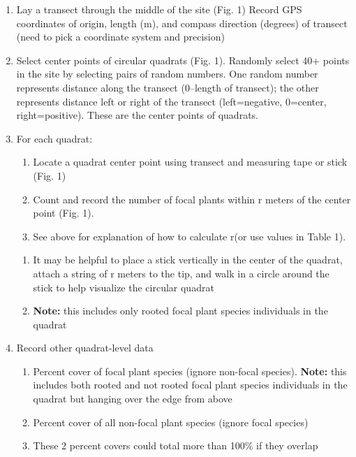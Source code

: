 \documentclass[
  letterpaper,
  DIV=11,
  numbers=noendperiod]{scrreprt}
\begin{document}
\begin{enumerate}
\def\labelenumi{\arabic{enumi}.}
\setcounter{enumi}{4}
\item
  Lay a transect through the middle of the site (Fig. 1) Record GPS
  coordinates of origin, length (m), and compass direction (degrees) of
  transect (need to pick a coordinate system and precision)
\item
  Select center points of circular quadrats (Fig. 1). Randomly select
  40+ points in the site by selecting pairs of random numbers. One
  random number represents distance along the transect (0--length of
  transect); the other represents distance left or right of the transect
  (left=negative, 0=center, right=positive). These are the center points
  of quadrats.
\item
  For each quadrat:

  \begin{enumerate}
  \def\labelenumii{\alph{enumii}.}
  \item
    Locate a quadrat center point using transect and measuring tape or
    stick (Fig. 1)
  \item
    Count and record the number of focal plants within r meters of the
    center point (Fig. 1).
  \item
    See above for explanation of how to calculate r(or use values in
    Table 1).
  \end{enumerate}

  \begin{enumerate}
  \def\labelenumii{\roman{enumii}.}
  \setcounter{enumii}{1}
  \item
    It may be helpful to place a stick vertically in the center of the
    quadrat, attach a string of r meters to the tip, and walk in a
    circle around the stick to help visualize the circular quadrat
  \item
    \textbf{Note:} this includes only rooted focal plant species
    individuals in the quadrat
  \end{enumerate}
\item
  Record other quadrat-level data

  \begin{enumerate}
  \def\labelenumii{\alph{enumii}.}
  \item
    Percent cover of focal plant species (ignore non-focal species).
    \textbf{Note:} this includes both rooted and not rooted focal plant
    species individuals in the quadrat but hanging over the edge from
    above
  \item
    Percent cover of all non-focal plant species (ignore focal species)
  \item
    These 2 percent covers could total more than 100\% if they overlap
  \end{enumerate}


\end{enumerate}
\end{document}
